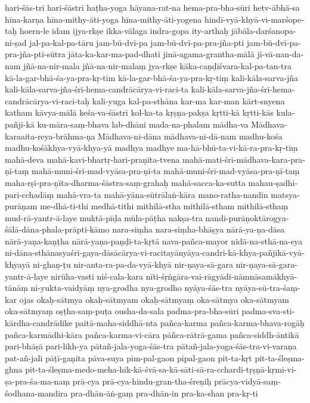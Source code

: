 {{hari-śās-trī
hari-śāstrī
haṭha-yoga
hāyana-rat-na
hema-pra-bha-sūri
hetv-ābhā-sa
hīna-karṇa
hīna-mithy-āti-yoga
hīna-mithy-āti-yogena
hindī-vyā-khyā-vi-marśope-taḥ
hoern-le
idam
ijya-rkṣe
ikka-vālaga
indra-gopa
ity-arthaḥ
jābāla-darśanopa-ni-ṣad
jal-pa-kal-pa-tāru
jam-bū-dvī-pa
jam-bū-dvī-pa-pra-jña-pti
jam-bū-dvī-pa-pra-jña-pti-sūtra
jāta-ka-kar-ma-pad-dhati
jinā-agama-grantha-mālā
jī-vā-nan-da-nam
jñā-na-nir-mala
jñā-na-nir-malaṃ
jya-rkṣe
kāka-caṇḍīśvara-kal-pa-tan-tra
kā-la-gar-bhā-śa-ya-pra-kṛ-tim
kā-la-gar-bhā-śa-ya-pra-kṛ-tiṃ
kali-kāla-sarva-jña
kali-kāla-sarva-jña-śrī-hema-candrācārya-vi-raci-ta
kali-kāla-sarva-jña-śrī-hema-candrācārya-vi-raci-taḥ
kali-yuga
kal-pa-sthāna
kar-ma
kar-man
kārt-snyena
katham
kāvya-mālā
keśa-va-śāstrī
kol-ka-ta
kṛṣṇa-pakṣa
kṛtti-kā
kṛtti-kās
kula-pañji-kā
ku-māra-saṃ-bhava
lab-dhāni
mada-na-phalam
mādha-va
Mādhava-karaaita-reya-brāhma-ṇa
Mādhava-ni-dāna
mādhava-ni-dā-nam
madhu-kośa
madhu-kośākhya-vyā-khya-yā
madhya
madhye
ma-hā-bhū-ta-vi-kā-ra-pra-kṛ-tiṃ
mahā-deva
mahā-kavi-bhartṛ-hari-praṇīta-tvena
mahā-mati-śrī-mādhava-kara-pra-ṇī-taṃ
mahā-muni-śrī-mad-vyāsa-pra-ṇī-ta
mahā-muni-śrī-mad-vyāsa-pra-ṇī-taṃ
maha-rṣi-pra-ṇīta-dharma-śāstra-saṃ-grahaḥ
mahā-sacca-ka-sutta
mahau-ṣadhi-pari-cchadāṃ
mahā-vra-ta
mahā-yāna-sūtrālaṅ-kāra
mano-ratha-nandin
matsya-purāṇam
me-dhā-ti-thi
medhā-tithi
mithilā-stha
mithilā-stham
mithilā-sthaṃ
mud-rā-yantr-ā-laye
muktā-pīḍa
mūla-pāṭha
nakṣa-tra
nandi-purāṇoktārogya-śālā-dāna-phala-prāpti-kāmo
nara-siṃha
nara-siṃha-bhāṣya
nārā-ya-ṇa-dāsa
nārā-yaṇa-kaṇṭha
nārā-yaṇa-paṇḍi-ta-kṛtā
nava-pañca-mayor
nidā-na-sthā-na-sya
ni-dāna-sthānasyaśrī-gaya-dāsācārya-vi-racitayānyāya-candri-kā-khya-pañjikā-vyā-khyayā
ni-ghaṇ-ṭu
nir-anta-ra-pa-da-vyā-khyā
nir-ṇaya-sā-gara
nir-ṇaya-sā-gara-yantr-ā-laye
nirūha-vasti
niś-cala-kara
nīti-śṛṅgāra-vai-rāgyādi-nāmnāsamākhyā-tānāṃ
ni-yukta-vaidyāṃ
nya-grodha
nya-grodho
nyāya-śās-tra
nyāya-sū-tra-śaṃ-kar
ojas
okaḥ-sātmya
okaḥ-sātmyam
okaḥ-sātmyaṃ
oka-sātmya
oka-sātmyam
oka-sātmyaṃ
oṣṭha-saṃ-puṭa
ousha-da-sala
padma-pra-bha-sūri
padma-sva-sti-kārdha-candrādike
paitā-maha-siddhā-nta
pañca-karma
pañca-karma-bhava-rogāḥ
pañca-karmādhi-kāra
pañca-karma-vi-cāra
pāñca-rātrā-gama
pañca-siddh-āntikā
pari-bhāṣā
pari-likh-ya
pātañ-jala-yoga-śās-tra
pātañ-jala-yoga-śās-tra-vi-varaṇa
pat-añ-jali
pāṭī-gaṇita
pāva-suya
pim-pal-gaon
pipal-gaon
pit-ta-kṛt
pit-ta-śleṣma-ghna
pit-ta-śleṣma-medo-meha-hik-kā-śvā-sa-kā-sāti-sā-ra-cchardi-tṛṣṇā-kṛmi-vi-ṣa-pra-śa-ma-naṃ
prā-cya
prā-cya-hindu-gran-tha-śreṇiḥ
prācya-vidyā-saṃ-śodhana-mandira
pra-dhān-āṅ-gaṃ
pra-dhān-in
pra-ka-shan
pra-kṛ-ti
}}
